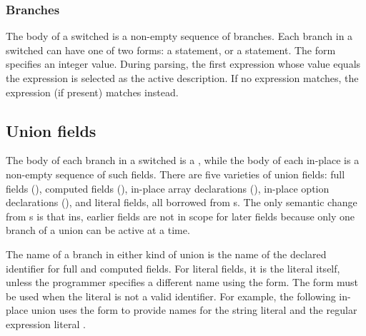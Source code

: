 \subsubsection{Branches}
The body of a switched \Punion{} is a non-empty sequence of branches.
Each branch in a switched \Punion{} can have one of two forms: a
\Pcase{} statement, or a \Pdefault{} statement.  The \Pcase{} form
specifies an integer value.  During parsing, the first \Pcase{}
expression whose value equals the \Pswitch{} expression is selected as
the active description. If no \Pcase{} expression
matches, the \Pdefault{} expression (if present) matches instead.

\subsection{Union fields}
The body of each branch in a switched \Punion{} is a ,
while the body of each in-place \Punion{} is a non-empty sequence of
such fields. 
There are five varieties of union fields: 
full fields (),
computed fields (), 
in-place array declarations (),
in-place option declarations (),
and literal fields, all borrowed from \Pstruct{}s.
The only semantic change from \Pstruct{}s  is
that in\Punion{}s, earlier fields are not in scope for later fields
because only one branch of a union can be active at a time.

The name of a branch in either kind of union is the name of the
declared identifier for full and computed fields.  For literal fields,
it is the literal itself, unless the programmer specifies a different
name using the \Pfrom{} form.  The \Pfrom{} form must be used when the
literal is not a valid \C{} identifier.  For example, the following
in-place union uses the \Pfrom{} form to provide names for the
string literal  and the regular expression literal .




